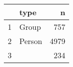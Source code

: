 \begin{table}[ht]
\centering
\begin{tabular}{rlr}
  \hline
 & type & n \\ 
  \hline
1 & Group & 757 \\ 
  2 & Person & 4979 \\ 
  3 &  & 234 \\ 
   \hline
\end{tabular}
\end{table}

